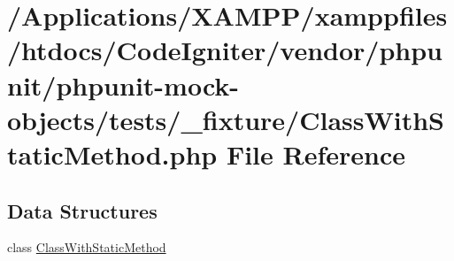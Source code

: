 \hypertarget{_class_with_static_method_8php}{}\section{/\+Applications/\+X\+A\+M\+P\+P/xamppfiles/htdocs/\+Code\+Igniter/vendor/phpunit/phpunit-\/mock-\/objects/tests/\+\_\+fixture/\+Class\+With\+Static\+Method.php File Reference}
\label{_class_with_static_method_8php}
\subsection*{Data Structures}
\begin{DoxyCompactItemize}
\item 
class \mbox{\hyperlink{class_class_with_static_method}{Class\+With\+Static\+Method}}
\end{DoxyCompactItemize}
